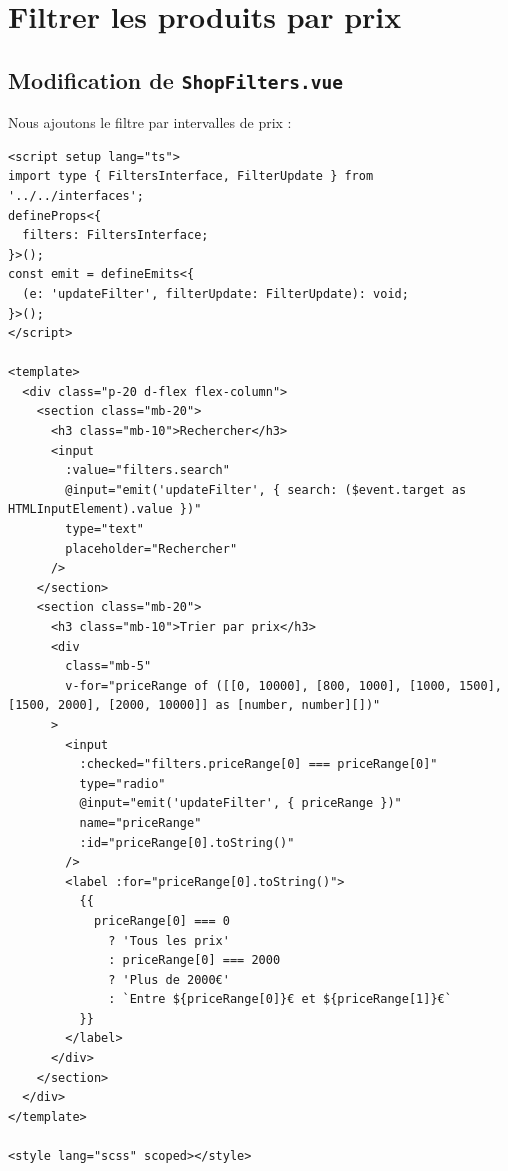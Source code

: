 \section{Filtrer les produits par prix}
\subsection{Modification de {\tt ShopFilters.vue}}
Nous ajoutons le filtre par intervalles de prix :
\begin{verbatim}
<script setup lang="ts">
import type { FiltersInterface, FilterUpdate } from '../../interfaces';
defineProps<{
  filters: FiltersInterface;
}>();
const emit = defineEmits<{
  (e: 'updateFilter', filterUpdate: FilterUpdate): void;
}>();
</script>

<template>
  <div class="p-20 d-flex flex-column">
    <section class="mb-20">
      <h3 class="mb-10">Rechercher</h3>
      <input
        :value="filters.search"
        @input="emit('updateFilter', { search: ($event.target as HTMLInputElement).value })"
        type="text"
        placeholder="Rechercher"
      />
    </section>
    <section class="mb-20">
      <h3 class="mb-10">Trier par prix</h3>
      <div
        class="mb-5"
        v-for="priceRange of ([[0, 10000], [800, 1000], [1000, 1500], [1500, 2000], [2000, 10000]] as [number, number][])"
      >
        <input
          :checked="filters.priceRange[0] === priceRange[0]"
          type="radio"
          @input="emit('updateFilter', { priceRange })"
          name="priceRange"
          :id="priceRange[0].toString()"
        />
        <label :for="priceRange[0].toString()">
          {{
            priceRange[0] === 0
              ? 'Tous les prix'
              : priceRange[0] === 2000
              ? 'Plus de 2000€'
              : `Entre ${priceRange[0]}€ et ${priceRange[1]}€`
          }}
        </label>
      </div>
    </section>
  </div>
</template>

<style lang="scss" scoped></style>
\end{verbatim}

